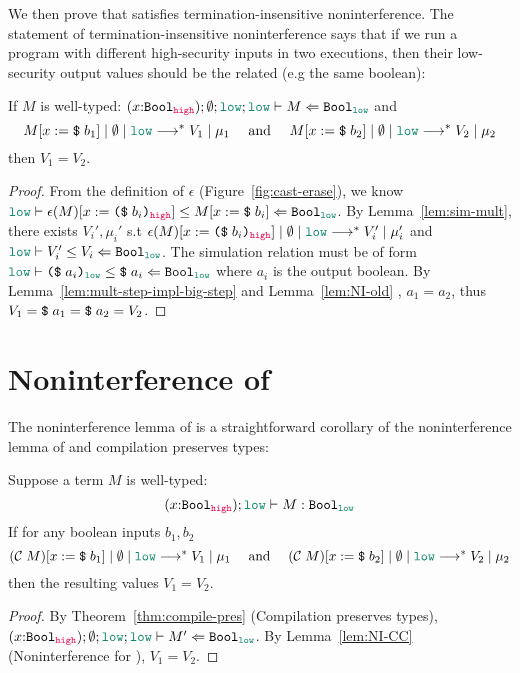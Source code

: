 We then prove that \CC satisfies termination-insensitive noninterference. The
statement of termination-insensitive noninterference says that if we run a
program with different high-security inputs in two executions, then their
low-security output values should be the related (e.g the same boolean):

\begin{lemma}
\label{lem:NI-CC}
If $M$ is well-typed:
$(x{:}\Bool_{\high}) ; \emptyset ; \low ; \low \vdash M \Leftarrow \Bool_{\low}$
and
{\normalfont
\begin{equation*}
\reducemult{M [ x := \ccconst{b_1}]}{\emptyset}{\low}{V_1}{\mu_1}
\quad\text{ and }\quad
\reducemult{M [ x := \ccconst{b_2}]}{\emptyset}{\low}{V_2}{\mu_2}
\end{equation*}}
then $V_1 = V_2$.
\end{lemma}
\begin{proof}
From the definition of $\epsilon$ (Figure~\ref{fig:cast-erase}), we know
$\simrel{\low}{\epsilon(M)[x:= \dynconst{b_i}{\high}]}{M [ x :=
    \ccconst{b_i}]}{\Bool_{\low}}$. By Lemma~\ref{lem:sim-mult}, there exists
$V_i', \mu_i'$ s.t $\reducemult{\epsilon(M)[x:=
    \dynconst{b_i}{\high}]}{\emptyset}{\low}{V_i'}{\mu_i'}$ and
$\simrel{\low}{V_i'}{V_i}{\Bool_{\low}}$. The simulation relation must be of
form $\simrel{\low}{\dynconst{a_i}{\low}}{\ccconst{a_i}}{\Bool_{\low}}$ where
$a_i$ is the output boolean. By Lemma~\ref{lem:mult-step-impl-big-step} and
Lemma~\ref{lem:NI-old} , $a_1 = a_2$, thus $V_1 = \text{\texttt{{\$}}}\;{a_1} = \text{\texttt{{\$}}}\;{a_2}
= V_2$.
\end{proof}

\section{Noninterference of \Surface}
\label{sec:NI}

The noninterference lemma of \Surface is a straightforward corollary of the
noninterference lemma of \CC and compilation preserves types:

\begin{lemma}
\label{lem:NI-Surface}
Suppose a \Surface term $M$ is well-typed:
\[
(x{:}\Bool_{\high}) ; \low \vdash M : \Bool_{\low}
\]
If for any boolean inputs $b_1,b_2$
{\normalfont
\begin{equation*}
\reducemult{(\compile{M}) [ x := \ccconst{b_1}]}{\emptyset}{\low}{V_1}{\mu_1}
\quad\text{ and }\quad
\reducemult{(\compile{M}) [ x := \ccconst{b_2}]}{\emptyset}{\low}{V_2}{\mu_2}
\end{equation*}}
then the resulting values $V_1 = V_2$.
\end{lemma}
\begin{proof}
By Theorem~\ref{thm:compile-pres} (Compilation preserves types),
$(x{:}\Bool_{\high}) ; \emptyset ; \low ; \low \vdash M' \Leftarrow \Bool_{\low}$.
By Lemma~\ref{lem:NI-CC} (Noninterference for \CC), $V_1 = V_2$.
\end{proof}

